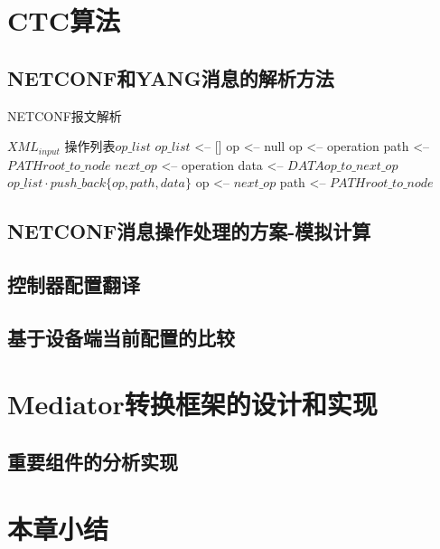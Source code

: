 \documentclass[algorithmlist, figurelist,tablelist, nomlist,engineering]{seuthesix}
\begin{document}
\section{CTC算法}

\subsection{NETCONF和YANG消息的解析方法}

\begin{algorithm}[h]
	\caption{NETCONF报文解析}  
	\begin{algorithmic}[1] %
		\REQUIRE $XML_{input}$
		\ENSURE 操作列表$op\_list $
		\STATE $op\_list$ <-- [\quad]
		\STATE op <-- null
		\STATE op <-- operation
		\STATE path <-- $PATH{root\_to\_node}$
		\ELSE
		\STATE $next\_op$ <-- operation
		\STATE data <-- ${DATA{op\_to\_next\_op}}$
		\STATE $op\_list{\cdot}{push\_back}\{op,path,data\}$
		\STATE op <-- $next\_op$
		\STATE path <-- $PATH{root\_to\_node}$
		\ENDIF
		\ENDIF
		\ENDFOR
		\STATE{}
	\end{algorithmic}  
\end{algorithm} 


\subsection{NETCONF消息操作处理的方案-模拟计算}


\subsection{控制器配置翻译}


\subsection{基于设备端当前配置的比较}

\section{Mediator转换框架的设计和实现}

\subsection{重要组件的分析实现}

\section{本章小结}
\end{document}
